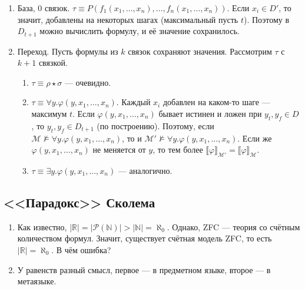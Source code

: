 \begin{enumerate}
\item База, 0 связок. $\tau \equiv P(f_1(x_1,\dots,x_n),\dots,f_n(x_1,\dots,x_n))$. Если $x_i \in D'$, то значит, добавлены на некоторых шагах (максимальный пусть $t$). Поэтому в $D_{t+1}$ можно вычислить формулу, и её значение сохранилось.
\item Переход. Пусть формулы из $k$ связок сохраняют значения. Рассмотрим $\tau$ с $k+1$ связкой.
\begin{enumerate}
\item $\tau \equiv \rho \star \sigma$ --- очевидно.
\item $\tau\equiv\forall y.\varphi(y,x_1,\dots,x_n)$. Каждый $x_i$ добавлен на каком-то шаге --- максимум $t$. Если $\varphi(y,x_1,\dots,x_n)$ бывает истинен и ложен при $y_t, y_f \in D$, то $y_t, y_f \in D_{t+1}$ (по построению). Поэтому, если $\mathcal{M}\not\models\forall y.\varphi(y,x_1,\dots,x_n)$, то и $\mathcal{M'}\not\models\forall y.\varphi(y,x_1,\dots,x_n)$. Если же $\varphi(y,x_1,\dots,x_n)$ не меняется от $y$, то тем более $\llbracket \varphi \rrbracket_\mathcal{M'} = \llbracket \varphi \rrbracket_\mathcal{M}$.
\item $\tau\equiv\exists y.\varphi(y,x_1,\dots,x_n)$ --- аналогично.
\end{enumerate}
\end{enumerate}

\subsection{<<Парадокс>> Сколема}

\begin{enumerate}
\item Как известно, $|\mathbb{R}| = |\mathcal{P}(\mathbb{N})| > |\mathbb{N}| = \aleph_0$. Однако, ZFC --- теория со счётным количеством формул. Значит, существует счётная модель ZFC, то есть $|\mathbb{R}| = \aleph_0$. В чём ошибка?
\item У равенств разный смысл, первое --- в предметном языке, второе --- в метаязыке. 
\end{enumerate}

